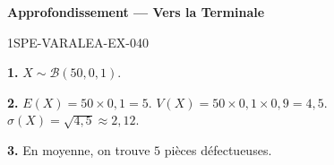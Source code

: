 \begin{center}\textbf{Approfondissement — Vers la Terminale}\end{center}
\begin{corrige}{1SPE-VARALEA-EX-040}

\textbf{1.} $X \sim \mathcal{B}(50, 0{,}1)$.

\textbf{2.} $E(X) = 50 \times 0{,}1 = 5$. $V(X) = 50 \times 0{,}1 \times 0{,}9 = 4{,}5$. $\sigma(X) = \sqrt{4{,}5} \approx 2{,}12$.

\textbf{3.} En moyenne, on trouve $5$ pièces défectueuses.

\end{corrige}
